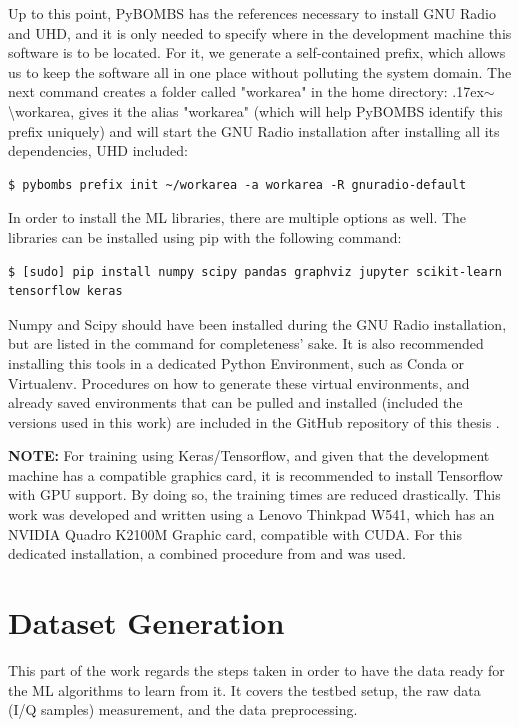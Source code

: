 Up to this point, \ac{PyBOMBS} has the references necessary to install GNU Radio and \ac{UHD}, and it is only needed to specify where in the development machine this software is to be located. For it, we generate a self-contained prefix, which allows us to keep the software all in one place without polluting the system domain. The next command creates a folder called "workarea" in the home directory: {\raise.17ex\hbox{$\scriptstyle\sim$}}\textbackslash workarea, gives it the alias "workarea" (which will help \ac{PyBOMBS} identify this prefix uniquely) and will start the GNU Radio installation after installing all its dependencies, \ac{UHD} included:

\begin{lstlisting}[breaklines=true]
    $ pybombs prefix init ~/workarea -a workarea -R gnuradio-default
\end{lstlisting}


In order to install the \ac{ML} libraries, there are multiple options as well. The libraries can be installed using pip with the following command:

\begin{lstlisting}[breaklines=true]
    $ [sudo] pip install numpy scipy pandas graphviz jupyter scikit-learn tensorflow keras
\end{lstlisting}

Numpy and Scipy should have been installed during the GNU Radio installation, but are listed in the command for completeness' sake. It is also recommended installing this tools in a dedicated Python Environment, such as Conda or Virtualenv. Procedures on how to generate these virtual environments, and already saved environments that can be pulled and installed (included the versions used in this work) are included in the GitHub repository of this thesis \cite{repo:cognitive_radio_ml}.

\textbf{NOTE:} For training using Keras/Tensorflow, and given that the development machine has a compatible graphics card, it is recommended to install Tensorflow with GPU support. By doing so, the training times are reduced drastically. This work was developed and written using a Lenovo Thinkpad W541, which has an NVIDIA Quadro K2100M Graphic card, compatible with CUDA. For this dedicated installation, a combined procedure from \cite{Yadak} and \cite{Andrews} was used.

\section{Dataset Generation}
This part of the work regards the steps taken in order to have the data ready for the \ac{ML} algorithms to learn from it. It covers the testbed setup, the raw data (I/Q samples) measurement, and the data preprocessing.
